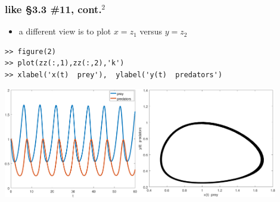\documentclass[urlcolor=blue,dvipsnames]{beamer}
\begin{document}
\begin{frame}[fragile]
\frametitle{like \S3.3 \#11, cont.$^2$}

\begin{itemize}
\item a different view is to plot $x=z_1$ versus $y=z_2$
\end{itemize}

\begin{Verbatim}[fontsize=\small]
>> figure(2)
>> plot(zz(:,1),zz(:,2),'k')
>> xlabel('x(t)  prey'),  ylabel('y(t)  predators')
\end{Verbatim}

\bigskip
\includegraphics[width=0.44\textwidth]{figs/lotka-time}\quad \includegraphics[width=0.46\textwidth]{figs/lotka-phase}
\end{frame}
\end{document}

